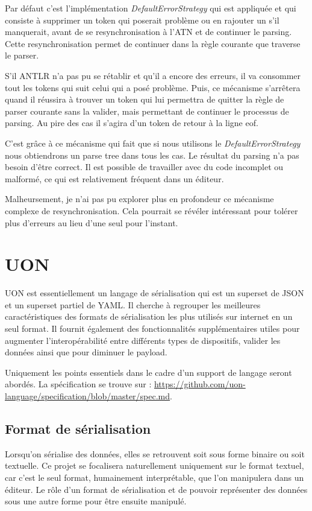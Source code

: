 \documentclass[
    iict, %
    il, %
]{heig-tb}
\begin{document}
Par défaut c'est l'implémentation \emph{DefaultErrorStrategy} qui est appliquée et qui consiste à supprimer un token qui poserait problème ou en rajouter un s'il manquerait, avant de
se resynchronisation à l'ATN et de continuer le parsing. Cette resynchronisation permet de continuer dans la règle courante que traverse le parser. \cite{antlrs-error-handling-strategy}

S'il ANTLR n'a pas pu se rétablir et qu'il a encore des erreurs, il va consommer tout les tokens qui suit celui qui a posé problème.
Puis, ce mécanisme s'arrêtera quand il réussira à trouver un token qui lui permettra de quitter la règle de parser courante sans la valider, mais permettant de continuer le processus de parsing.
Au pire des cas il s'agira d'un token de retour à la ligne \Gls{eof}.

C'est grâce à ce mécanisme qui fait que si nous utilisons le \emph{DefaultErrorStrategy} nous obtiendrons un parse tree dans tous les cas.
Le résultat du parsing n'a pas besoin d'être correct. Il est possible de travailler avec du code incomplet ou malformé, ce qui est relativement fréquent dans un éditeur.

Malheursement, je n'ai pas pu explorer plus en profondeur ce mécanisme complexe de resynchronisation.
Cela pourrait se révéler intéressant pour tolérer plus d'erreurs au lieu d'une seul pour l'instant.

\section{UON}\label{UON}
UON est essentiellement un langage de sérialisation qui est un superset de JSON et un superset partiel de YAML.
Il cherche à regrouper les meilleures caractéristiques des formats de sérialisation les plus utilisés sur internet en un seul format.
Il fournit également des fonctionnalités supplémentaires utiles pour augmenter l'interopérabilité entre différents types de dispositifs, valider les données ainsi que pour diminuer le payload.

Uniquement les points essentiels dans le cadre d'un support de langage seront abordés.
La spécification se trouve sur : \url{https://github.com/uon-language/specification/blob/master/spec.md}.

\subsection{Format de sérialisation}

Lorsqu'on sérialise des données, elles se retrouvent soit sous forme binaire ou soit textuelle.
Ce projet se focalisera naturellement uniquement sur le format textuel, car c'est le seul format, humainement interprétable, que l'on manipulera dans un éditeur.
Le rôle d'un format de sérialisation et de pouvoir représenter des données sous une autre forme pour être ensuite manipulé.
\end{document}
